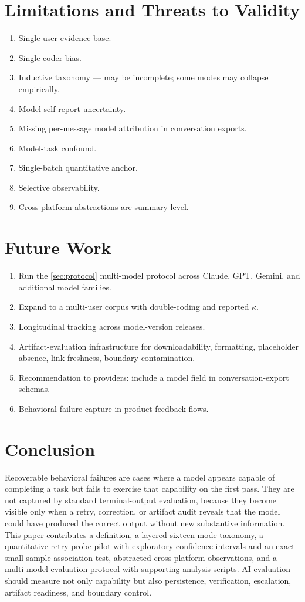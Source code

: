 \documentclass[11pt]{article}
\begin{document}
\section{Limitations and Threats to Validity}
\begin{enumerate}[leftmargin=*, label=\arabic*.]
  \item Single-user evidence base.
  \item Single-coder bias.
  \item Inductive taxonomy --- may be incomplete; some modes may collapse empirically.
  \item Model self-report uncertainty.
  \item Missing per-message model attribution in conversation exports.
  \item Model-task confound.
  \item Single-batch quantitative anchor.
  \item Selective observability.
  \item Cross-platform abstractions are summary-level.
\end{enumerate}

\section{Future Work}
\begin{enumerate}[leftmargin=*, label=\arabic*.]
  \item Run the \cref{sec:protocol} multi-model protocol across Claude, GPT, Gemini, and additional model families.
  \item Expand to a multi-user corpus with double-coding and reported $\kappa$.
  \item Longitudinal tracking across model-version releases.
  \item Artifact-evaluation infrastructure for downloadability, formatting, placeholder absence, link freshness, boundary contamination.
  \item Recommendation to providers: include a model field in conversation-export schemas.
  \item Behavioral-failure capture in product feedback flows.
\end{enumerate}

\section{Conclusion}
Recoverable behavioral failures are cases where a model appears capable of completing a task but fails to exercise that capability on the first pass. They are not captured by standard terminal-output evaluation, because they become visible only when a retry, correction, or artifact audit reveals that the model could have produced the correct output without new substantive information. This paper contributes a definition, a layered sixteen-mode taxonomy, a quantitative retry-probe pilot with exploratory confidence intervals and an exact small-sample association test, abstracted cross-platform observations, and a multi-model evaluation protocol with supporting analysis scripts. AI evaluation should measure not only capability but also persistence, verification, escalation, artifact readiness, and boundary control.
\end{document}
